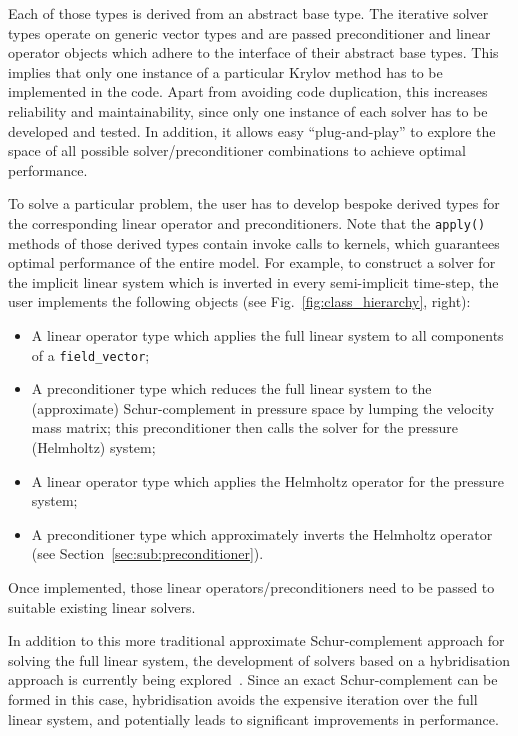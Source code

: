 \documentclass[review,times]{elsarticle}
\begin{document}
Each of those types is derived from an abstract base type. The
iterative solver types operate on generic vector types and are passed
preconditioner and linear operator objects which adhere to the
interface of their abstract base types.  This implies that only one
instance of a particular Krylov method has to be implemented in the
code. Apart from avoiding code duplication, this increases reliability
and maintainability, since only one instance of each solver has to be
developed and tested. In addition, it allows easy ``plug-and-play'' to
explore the space of all possible solver/preconditioner combinations
to achieve optimal performance.

To solve a particular problem, the user has to develop bespoke derived
types for the corresponding linear operator and preconditioners. Note
that the \texttt{apply()} methods of those derived types contain
invoke calls to kernels, which guarantees optimal performance of the entire
model. For example, to construct a solver for the implicit linear
system which is inverted in every semi-implicit time-step, the user
implements the following objects (see Fig.~\ref{fig:class_hierarchy},
right):
\begin{itemize}
\item A linear operator type which applies the full linear system to
  all components of a \texttt{field\_vector};
\item A preconditioner type which reduces the full linear system to
  the (approximate) Schur-complement in pressure space by lumping the
  velocity mass matrix; this preconditioner then calls the solver for
  the pressure (Helmholtz) system;
\item A linear operator type which applies the Helmholtz operator for
  the pressure system;
\item A preconditioner type which approximately inverts the Helmholtz
  operator (see Section~\ref{sec:sub:preconditioner}).
\end{itemize}
Once implemented, those linear operators/preconditioners need to be
passed to suitable existing linear solvers.

In addition to this more traditional approximate Schur-complement
approach for solving the full linear system, the development of
solvers based on a hybridisation approach is currently being 
explored~\cite{cockburnandjay2004,DBLP:journals/corr/abs-1802-00303}. 
Since an exact Schur-complement can be formed in this case, hybridisation
avoids the expensive iteration over the full linear system, and
potentially leads to significant improvements in performance.
\end{document}
